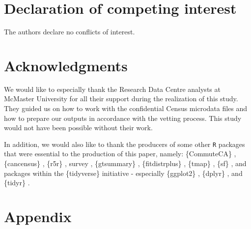 \documentclass[preprint, 3p,
authoryear]{elsarticle} %
\begin{document}
\section*{Declaration of competing
interest}\label{declaration-of-competing-interest}

The authors declare no conflicts of interest.

\section*{Acknowledgments}\label{acknowledgments}

We would like to especially thank the Research Data Centre analysts at
McMaster University for all their support during the realization of this
study. They guided us on how to work with the confidential Census
microdata files and how to prepare our outputs in accordance with the
vetting process. This study would not have been possible without their
work.

In addition, we would also like to thank the producers of some other
\texttt{R} packages that were essential to the production of this paper,
namely: \{CommuteCA\} \citep{CommuteCA}, \{cancensus\}
\citep{cancensus}, \{r5r\} \citep{pereira2021a}, survey
\citep{lumley2011}, \{gtsummary\} \citep{gtsummary}, \{fitdistrplus\}
\citep{delignette2015fitdistrplus}, \{tmap\} \citep{tmap}, \{sf\}
\citep{sf}, and packages within the \{tidyverse\} initiative
\citep{tidyverse} - especially \{ggplot2\} \citep{ggplot2}, \{dplyr\}
\citep{dplyr}, and \{tidyr\} \citep{tidyr}.

\section*{Appendix}\label{appendix}

\renewcommand{\thetable}{A.1}
\end{document}

